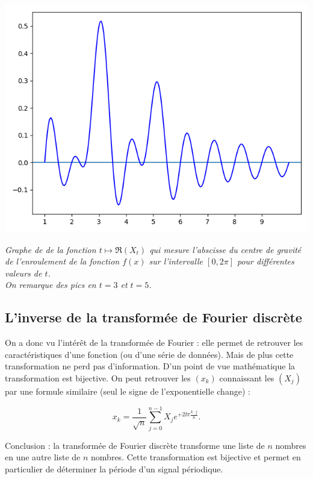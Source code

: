 \documentclass[11pt,class=report,crop=false]{standalone}
\begin{document}
\begin{center}
\includegraphics[scale=\myscale,scale=0.5]{figures/fourier-10}

\nopagebreak

\begin{minipage}{0.8\textwidth}
\center\emph{Graphe de de la fonction $t \mapsto \Re(X_t)$ qui mesure l'abscisse du centre de gravité de l'enroulement de la fonction $f(x)$ sur l'intervalle $[0,2\pi]$ pour différentes valeurs de $t$.\\ On remarque des pics en $t=3$ et $t=5$.
}
\end{minipage}
\end{center}


\subsection{L'inverse de la transformée de Fourier discrète}

On a donc vu l'intérêt de la transformée de Fourier : elle permet de retrouver les caractéristiques d'une fonction (ou d'une série de données). Mais de plus cette transformation ne perd pas d'information. D'un point de vue mathématique la transformation est bijective. On peut retrouver les $(x_k)$ connaissant les $(X_j)$ par une formule similaire (seul le signe de l'exponentielle change) :

$$x_k = \frac{1}{\sqrt n}\sum_{j=0}^{n-1} X_j e^{+2\ii\pi \frac{k \cdot j}{n}}.$$


Conclusion : la transformée de Fourier discrète transforme une liste de $n$ nombres en  une autre liste de $n$ nombres. Cette transformation est bijective et permet en particulier de déterminer la période d'un signal périodique.
\end{document}
